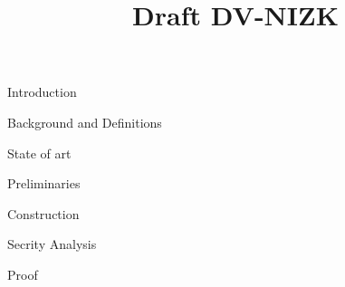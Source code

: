



\pagestyle{plain}

\title{Draft DV-NIZK}

\maketitle

\begin{section}{Introduction}

\end{section}

\begin{section}{Background and Definitions}

\end{section}

\begin{section}{State of art}

\end{section}

\begin{section}{Preliminaries}

\end{section}

\begin{section}{Construction}

\end{section}


\begin{section}{Secrity Analysis}
  
\end{section}
\begin{section}{Proof}

\end{section}










